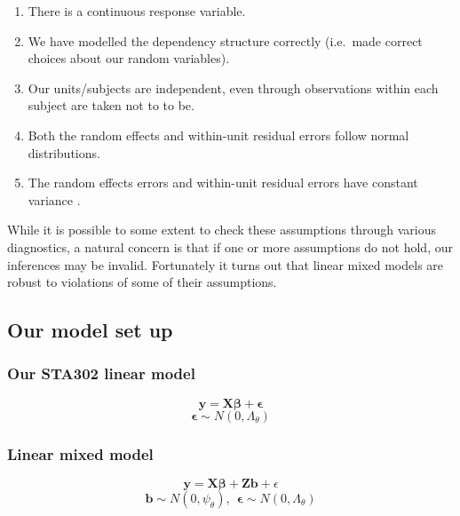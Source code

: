 \documentclass[
  openany]{book}
\providecommand{\tightlist}{%
  \setlength{\itemsep}{0pt}\setlength{\parskip}{0pt}}
\begin{document}
\begin{enumerate}
\def\labelenumi{\arabic{enumi}.}
\tightlist
\item
  There is a continuous response variable.
\item
  We have modelled the dependency structure correctly (i.e.~made correct choices about our random variables).
\item
  Our units/subjects are independent, even through observations within each subject are taken not to to be.
\item
  Both the random effects and within-unit residual errors follow normal distributions.
\item
  The random effects errors and within-unit residual errors have constant variance .
\end{enumerate}

While it is possible to some extent to check these assumptions through various diagnostics, a natural concern is that if one or more assumptions do not hold, our inferences may be invalid. Fortunately it turns out that linear mixed models are robust to violations of some of their assumptions.

\hypertarget{our-model-set-up}{%
\subsection{Our model set up}\label{our-model-set-up}}

\hypertarget{our-sta302-linear-model}{%
\subsubsection{Our STA302 linear model}\label{our-sta302-linear-model}}

\[\boldsymbol{y} = \boldsymbol{X\beta} + \boldsymbol{\epsilon}\]
\[\boldsymbol{\epsilon} \sim N(0, \Lambda_\theta)\]

\hypertarget{linear-mixed-model}{%
\subsubsection{Linear mixed model}\label{linear-mixed-model}}

\[\boldsymbol{y} = \boldsymbol{X\beta} + \boldsymbol{Zb} + \epsilon\]
\[\boldsymbol{b} \sim N(0, \psi_\theta),\ \  \boldsymbol{\epsilon} \sim N(0, \Lambda_\theta)\]
\end{document}
